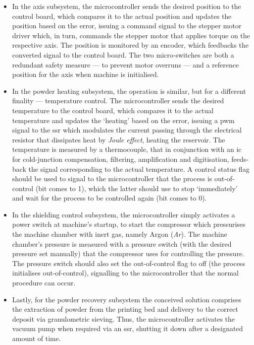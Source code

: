 \begin{itemize}
\item In the axis subsystem, the microcontroller sends the desired position to
  the control board, which compares it to the actual position and updates the
  position based on the error, issuing a command signal to the stepper motor
  driver which, in turn, commands the stepper motor that applies torque on the
  respective axis. The position is monitored by an encoder, which feedbacks
  the converted signal to the control board. The two micro-switches are both a
  redundant safety measure --- to prevent motor overruns --- and a reference
  position for the axis when machine is initialised.
\item In the powder heating subsystem, the operation is similar, but for a different
  finality --- temperature control. The microcontroller sends the desired
  temperature to the control board, which compares it to the actual
  temperature and updates the `heating' based on the error, issuing a
  \gls{pwm} signal to the \gls{ssr} which modulates the current passing
  through the electrical resistor that dissipates heat by \emph{Joule effect},
  heating the reservoir. The temperature is measured by a thermocouple, that
  in conjunction with an \gls{ic} for cold-junction compensation, filtering,
  amplification and digitisation, feeds-back the signal corresponding to the
  actual temperature. A control status flag should be used to signal to the
  microcontroller that the process is out-of-control (bit comes to 1), which
  the latter should use to stop `immediately' and wait for the process to be
  controlled again (bit comes to 0).
\item In the shielding control subsystem, the microcontroller simply
  activates a power switch at machine's startup, to start the compressor which
  pressurises the machine chamber with inert gas, namely Argon
  (\emph{Ar}). The machine chamber's pressure is measured with a pressure
  switch (with the desired pressure set manually) that the compressor uses for
  controlling the pressure. The pressure switch should also set the
  out-of-control flag to off (the process initialises out-of-control),
  signalling to the microcontroller that the normal procedure can occur.
\item Lastly, for the powder recovery subsystem the conceived solution
  comprises the extraction of powder from the printing bed and delivery to the
  correct deposit via granulometric sieving. Thus, the microcontroller
  activates the vacuum pump when required via an \gls{ssr}, shutting it down
  after a designated amount of time.
\end{itemize}


